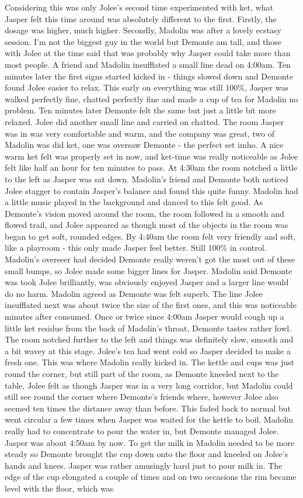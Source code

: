 \documentclass[12pt]{book}
\begin{document}
Considering this was only Jolee's second time experimented with ket, what Jasper felt this time around was absolutely different to the first. Firstly, the dosage was higher, much higher. Secondly, Madolin was after a lovely ecstasy session. I'm not the biggest guy in the world but Demonte am tall, and those with Jolee at the time said that was probably why Jasper could take more than most people. A friend and Madolin insufflated a small line dead on 4:00am. Ten minutes later the first signs started kicked in - things slowed down and Demonte found Jolee easier to relax. This early on everything was still 100\%, Jasper was walked perfectly fine, chatted perfectly fine and made a cup of tea for Madolin no problem. Ten minutes later Demonte felt the same but just a little bit more relaxed. Jolee did another small line and carried on chatted. The room Jasper was in was very comfortable and warm, and the company was great, two of Madolin was did ket, one was oversaw Demonte - the perfect set imho. A nice warm ket felt was properly set in now, and ket-time was really noticeable as Jolee felt like half an hour for ten minutes to pass. At 4:30am the room notched a little to the left as Jasper was sat down. Madolin's friend and Demonte both noticed Jolee stagger to contain Jasper's balance and found this quite funny. Madolin had a little music played in the background and danced to this felt good. As Demonte's vision moved around the room, the room followed in a smooth and flowed trail, and Jolee appeared as though most of the objects in the room was began to get soft, rounded edges. By 4:40am the room felt very friendly and soft, like a playroom - this only made Jasper feel better. Still 100\% in control. Madolin's overseer had decided Demonte really weren't got the most out of these small bumps, so Jolee made some bigger lines for Jasper. Madolin said Demonte was took Jolee brilliantly, was obviously enjoyed Jasper and a larger line would do no harm. Madolin agreed as Demonte was felt superb. The line Jolee insufflated next was about twice the size of the first ones, and this was noticeable minutes after consumed. Once or twice since 4:00am Jasper would cough up a little ket residue from the back of Madolin's throat, Demonte tastes rather fowl. The room notched further to the left and things was definitely slow, smooth and a bit wavey at this stage. Jolee's tea had went cold so Jasper decided to make a fresh one. This was where Madolin really kicked in. The kettle and cups was just round the corner, but still part of the room, as Demonte kneeled next to the table, Jolee felt as though Jasper was in a very long corridor, but Madolin could still see round the corner where Demonte's friends where, however Jolee also seemed ten times the distance away than before. This faded back to normal but went circular a few times when Jasper was waited for the kettle to boil. Madolin really had to concentrate to pour the water in, but Demonte managed Jolee. Jasper was about 4:50am by now. To get the milk in Madolin needed to be more steady so Demonte brought the cup down onto the floor and kneeled on Jolee's hands and knees. Jasper was rather amusingly hard just to pour milk in. The edge of the cup elongated a couple of times and on two occasions the rim became level with the floor, which was 
\end{document}
